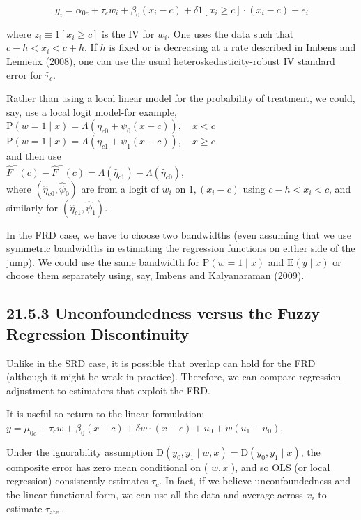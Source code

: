 \documentclass[10pt]{article}
\begin{document}
\begin{equation*}
y_{i}=\alpha_{0 c}+\tau_{c} w_{i}+\beta_{0}\left(x_{i}-c\right)+\delta 1\left[x_{i} \geq c\right] \cdot\left(x_{i}-c\right)+e_{i} \tag{21.108}
\end{equation*}


where $z_{i} \equiv 1\left[x_{i} \geq c\right]$ is the IV for $w_{i}$. One uses the data such that $c-h<x_{i}<c+h$. If $h$ is fixed or is decreasing at a rate described in Imbens and Lemieux (2008), one can use the usual heteroskedasticity-robust IV standard error for $\hat{\tau}_{c}$.

Rather than using a local linear model for the probability of treatment, we could, say, use a local logit model-for example,\\
$\mathrm{P}(w=1 \mid x)=\Lambda\left(\eta_{c 0}+\psi_{0}(x-c)\right), \quad x<c$\\
$\mathrm{P}(w=1 \mid x)=\Lambda\left(\eta_{c 1}+\psi_{1}(x-c)\right), \quad x \geq c$\\
and then use\\
$\hat{F}^{+}(c)-\hat{F}^{-}(c)=\Lambda\left(\hat{\eta}_{c 1}\right)-\Lambda\left(\hat{\eta}_{c 0}\right)$,\\
where $\left(\hat{\eta}_{c 0}, \hat{\psi}_{0}\right)$ are from a logit of $w_{i}$ on $1,\left(x_{i}-c\right)$ using $c-h<x_{i}<c$, and similarly for $\left(\hat{\eta}_{c 1}, \hat{\psi}_{1}\right)$.

In the FRD case, we have to choose two bandwidths (even assuming that we use symmetric bandwidths in estimating the regression functions on either side of the jump). We could use the same bandwidth for $\mathrm{P}(w=1 \mid x)$ and $\mathrm{E}(y \mid x)$ or choose them separately using, say, Imbens and Kalyanaraman (2009).

\subsection*{21.5.3 Unconfoundedness versus the Fuzzy Regression Discontinuity}
Unlike in the SRD case, it is possible that overlap can hold for the FRD (although it might be weak in practice). Therefore, we can compare regression adjustment to estimators that exploit the FRD.

It is useful to return to the linear formulation:\\
$y=\mu_{0 c}+\tau_{c} w+\beta_{0}(x-c)+\delta w \cdot(x-c)+u_{0}+w\left(u_{1}-u_{0}\right)$.

Under the ignorability assumption $\mathrm{D}\left(y_{0}, y_{1} \mid w, x\right)=\mathrm{D}\left(y_{0}, y_{1} \mid x\right)$, the composite error has zero mean conditional on ( $w, x$ ), and so OLS (or local regression) consistently estimates $\tau_{c}$. In fact, if we believe unconfoundedness and the linear functional form, we can use all the data and average across $x_{i}$ to estimate $\tau_{\text {ate }}$.
\end{document}
